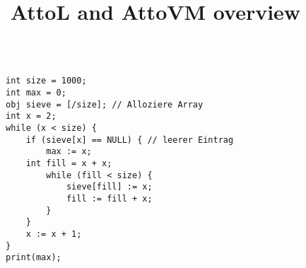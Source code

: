 \documentclass[11pt,a4paper]{article}
\title{AttoL and AttoVM overview}
\newcommand{\nta}[1]{\ensuremath{\textit{#1}}}
\begin{document}
\maketitle



\[
\]

\begin{figure}
\begin{verbatim}
int size = 1000;
int max = 0;
obj sieve = [/size]; // Alloziere Array
int x = 2;
while (x < size) {
    if (sieve[x] == NULL) { // leerer Eintrag
        max := x;
	int fill = x + x;
        while (fill < size) {
            sieve[fill] := x;
            fill := fill + x;
        }
    }
    x := x + 1;
}
print(max);
\end{verbatim}
\label{Sieve of Eratosthenes in AttoL}
\end{figure}
\end{document}
